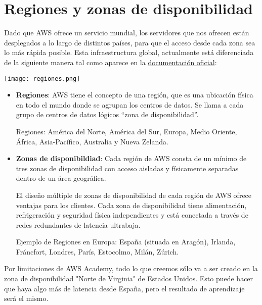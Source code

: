 \chapter{Regiones y zonas de disponibilidad}

Dado que AWS ofrece un servicio mundial, los servidores que nos ofrecen están desplegados a lo largo de distintos países, para que el acceso desde cada zona sea lo más rápida posible. Esta infraestructura global, actualmente está diferenciada de la siguiente manera tal como aparece en la \href{https://aws.amazon.com/es/about-aws/global-infrastructure/regions_az/?p=ngi&loc=2}{documentación oficial}:

\begin{center}
	\texttt{[image: regiones.png]}
\end{center}

\begin{itemize}
	\item \textbf{Regiones}: AWS tiene el concepto de una región, que es una ubicación física en todo el mundo donde se agrupan los centros de datos. Se llama a cada grupo de centros de datos lógicos “zona de disponibilidad”. 
	
	Regiones: América del Norte, América del Sur, Europa, Medio Oriente, África,  Asia-Pacífico, Australia y Nueva Zelanda.
	
	\item \textbf{Zonas de disponibildiad}: Cada región de AWS consta de un mínimo de tres zonas de disponibilidad con acceso aisladas y físicamente separadas dentro de un área geográfica. 
	
	El diseño múltiple de zonas de disponibilidad de cada región de AWS ofrece ventajas para los clientes. Cada zona de disponibilidad tiene alimentación, refrigeración y seguridad física independientes y está conectada a través de redes redundantes de latencia ultrabaja.
	
	Ejemplo de Regiones en Europa: España (situada en Aragón), Irlanda, Fráncfort, Londres, París, Estocolmo, Milán, Zúrich.
\end{itemize}


Por limitaciones de AWS Academy, todo lo que creemos sólo va a ser creado en la zona de disponibilidad "Norte de Virginia" de Estados Unidos. Esto puede hacer que haya algo más de latencia desde España, pero el resultado de aprendizaje será el mismo.